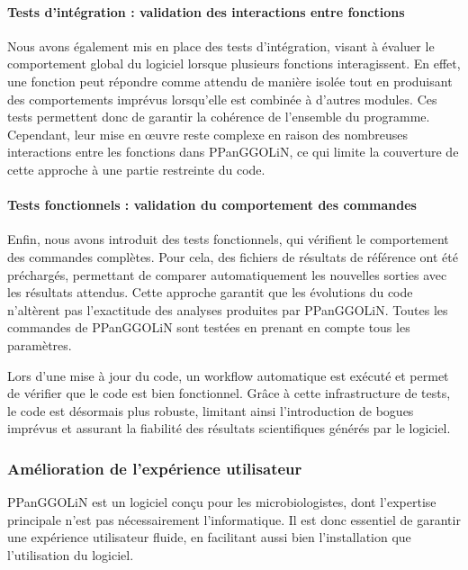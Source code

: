 \newpage

\paragraph{Tests d’intégration : validation des interactions entre fonctions}

Nous avons également mis en place des tests d'intégration, visant à évaluer le comportement global du logiciel lorsque plusieurs fonctions interagissent. En effet, une fonction peut répondre comme attendu de manière isolée tout en produisant des comportements imprévus lorsqu'elle est combinée à d'autres modules. Ces tests permettent donc de garantir la cohérence de l'ensemble du programme. Cependant, leur mise en \oe uvre reste complexe en raison des nombreuses interactions entre les fonctions dans PPanGGOLiN, ce qui limite la couverture de cette approche à une partie restreinte du code.

\paragraph{Tests fonctionnels : validation du comportement des commandes}

Enfin, nous avons introduit des tests fonctionnels, qui vérifient le comportement des commandes complètes. Pour cela, des fichiers de résultats de référence ont été préchargés, permettant de comparer automatiquement les nouvelles sorties avec les résultats attendus. Cette approche garantit que les évolutions du code n’altèrent pas l’exactitude des analyses produites par PPanGGOLiN. Toutes les commandes de PPanGGOLiN sont testées en prenant en compte tous les paramètres.


Lors d'une mise à jour du code, un workflow automatique est exécuté et permet de vérifier que le code est bien fonctionnel. Grâce à cette infrastructure de tests, le code est désormais plus robuste, limitant ainsi l’introduction de bogues imprévus et assurant la fiabilité des résultats scientifiques générés par le logiciel.

\subsubsection{Amélioration de l'expérience utilisateur}

PPanGGOLiN est un logiciel conçu pour les microbiologistes, dont l’expertise principale n’est pas nécessairement l’informatique. Il est donc essentiel de garantir une expérience utilisateur fluide, en facilitant aussi bien l’installation que l’utilisation du logiciel.

